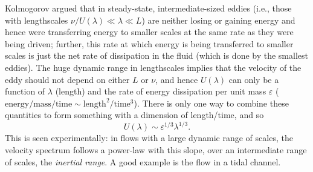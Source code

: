 Kolmogorov argued that in steady-state, intermediate-sized eddies (i.e., those with lengthscales $\nu/U(\lambda) \ll \lambda \ll L$) are neither losing or gaining energy and hence were transferring energy to smaller scales at the same rate as they were being driven; further, this rate at which energy is being transferred to smaller scales is just the net rate of dissipation in the fluid (which is done by the smallest eddies).  The huge dynamic range in lengthscales implies that the velocity of the eddy should not depend on either $L$ or $\nu$, and hence $U(\lambda)$ can only be a function of $\lambda$ (length) and the rate of energy dissipation per unit mass $\varepsilon$ ($\mathrm{energy/mass/time}\sim\mathrm{length^{2}/time^{3}}$). There is only one way to combine these quantities to form something with a dimension of length/time, and so
\begin{equation}\label{e.kolmogorov-velocity}
U(\lambda) \sim \varepsilon^{1/3}\lambda^{1/3}.
\end{equation}
This is seen experimentally: in flows with a large dynamic range of scales, the velocity spectrum follows a power-law with this slope, over an intermediate range of scales, the \emph{inertial range}.  A good example is the flow in a tidal channel\cite{Grant1962Turbulence-spec}.


